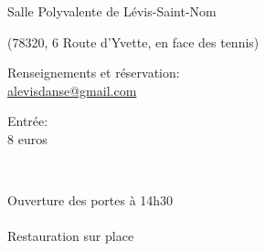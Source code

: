 \documentclass[12pt,a4paper]{article}
\begin{document}

\vspace*{15mm}

\fontsize{20pt}{20pt}\selectfont

Salle Polyvalente de Lévis-Saint-Nom

{\fontsize{14pt}{16pt}\selectfont
(78320, 6 Route d'Yvette, en face des tennis)}

\vspace*{5mm}

Renseignements et réservation: \\
\href{mailto:alevisdanse@gmail.com}{alevisdanse@gmail.com}


\vspace*{5mm}

Entrée: \\
8 euros

\vfill

~\hfill\begin{minipage}{0.25\linewidth}
  \begin{center}
    Ouverture des portes
    à 14h30\\
    ~\\
    Restauration
    sur place\\
    ~\\
    ~\\
    ~\\
\end{center}
\end{minipage}

\end{document}
